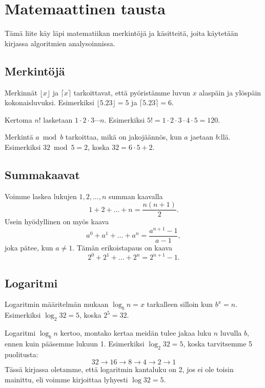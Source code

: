 \chapter{Matemaattinen tausta}

Tämä liite käy läpi matematiikan merkintöjä ja käsitteitä,
joita käytetään kirjassa algoritmien analysoinnissa.

\section*{Merkintöjä}

Merkinnät $\lfloor x \rfloor$ ja $\lceil x \rceil$ tarkoittavat,
että pyöristämme luvun $x$ alaspäin ja ylöspäin kokonaisluvuksi.
Esimerkiksi $\lfloor 5.23 \rfloor = 5$ ja $\lceil 5.23 \rceil = 6$.


Kertoma $n!$ lasketaan $1 \cdot 2 \cdot 3 \cdots n$.
Esimerkiksi $5! = 1 \cdot 2 \cdot 3 \cdot 4 \cdot 5 = 120$.


Merkintä $a \bmod b$ tarkoittaa,
mikä on jakojäännös, kun $a$ jaetaan $b$:llä.
Esimerkiksi $32 \bmod 5 = 2$, koska $32 = 6 \cdot 5 + 2$.

\section*{Summakaavat}


Voimme laskea lukujen $1,2,\dots,n$ summan kaavalla
\[1+2+\dots+n = \frac{n(n+1)}{2}.\]
Usein hyödyllinen on myös kaava
\[a^0+a^1+\dots+a^n = \frac{a^{n+1}-1}{a-1},\]
joka pätee, kun $a \neq 1$. Tämän erikoistapaus on kaava
\[2^0+2^1+\dots+2^n = 2^{n+1}-1.\]

\section*{Logaritmi}


Logaritmin määritelmän mukaan $\log_b n =x$
tarkalleen silloin kun $b^x=n$.
Esimerkiksi $\log_2 32=5$, koska $2^5=32$.

Logaritmi $\log_b n$ kertoo,
montako kertaa meidän tulee jakaa luku $n$ luvulla $b$,
ennen kuin pääsemme lukuun 1.
Esimerkiksi $\log_2 32 =5$, koska tarvitsemme 5 puolitusta:
\[32 \rightarrow 16 \rightarrow 8 \rightarrow 4 \rightarrow 2 \rightarrow 1\]
Tässä kirjassa oletamme, että logaritmin kantaluku on 2,
jos ei ole toisin mainittu,
eli voimme kirjoittaa lyhyesti $\log 32 = 5$.

